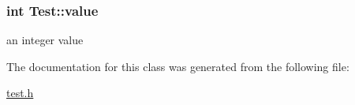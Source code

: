 \subsubsection[{value}]{\setlength{\rightskip}{0pt plus 5cm}int Test\+::value\hspace{0.3cm}{\ttfamily [protected]}}\label{classTest_ad55002283eba8ffa062dfb849f6c077c}


an integer value 



The documentation for this class was generated from the following file\+:\begin{DoxyCompactItemize}
\item 
\hyperlink{test_8h}{test.\+h}\end{DoxyCompactItemize}
